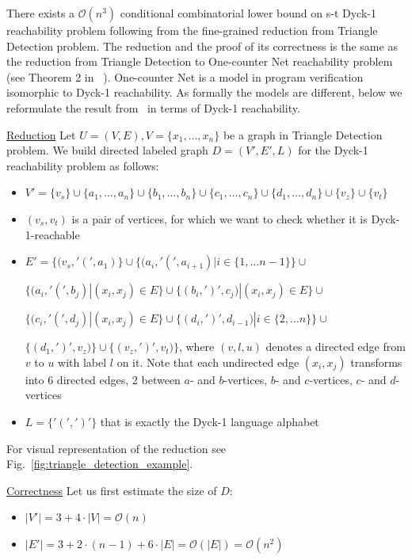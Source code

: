 \documentclass[12pt]{article}
\begin{document}
There exists a $\mathcal{O}(n^3)$ conditional combinatorial lower bound on s-t Dyck-1 reachability problem following from the fine-grained reduction from Triangle Detection problem. The reduction and the proof of its correctness is the same as the reduction from Triangle Detection to One-counter Net reachability problem (see Theorem 2 in ~\cite{hansen2021tight}). One-counter Net is a model in program verification isomorphic to Dyck-1 reachability. As formally the models are different, below we reformulate the result from~\cite{hansen2021tight} in terms of Dyck-1 reachability.

\underline{Reduction} Let $U = (V, E), V = \{x_1, \ldots, x_n\}$ be a graph in Triangle Detection problem. We build directed labeled graph $D = (V', E', L)$ for the Dyck-1 reachability problem as follows:

\begin{itemize}
    \item $V' = \{v_s\} \cup \{a_1, \ldots, a_n\} \cup \{b_1, \ldots, b_n\} \cup \{c_1, \ldots, c_n\} \cup \{d_1, \ldots, d_n\} \cup \{v_z\} \cup \{v_t\}$
    \item $(v_s, v_t)$ is a pair of vertices, for which we want to check whether it is Dyck-1-reachable
    \item $E' = \{(v_s, '(', a_1)\} \cup 
    \{(a_i, '(', a_{i+1})|i \in \{1, \ldots n - 1\}\} \cup$ 
    
    $\{(a_i, '(', b_j)|(x_i, x_j) \in E\} \cup
    \{(b_i, ')', c_j)|(x_i, x_j) \in E\} \cup$
    
    $\{(c_i, '(', d_j)|(x_i, x_j) \in E\} \cup
    \{(d_i, ')', d_{i-1})|i \in \{2, \ldots n\}\} \cup$
    
    $\{(d_1, ')', v_z)\} \cup \{(v_z, ')', v_t)\}$, where $(v, l, u)$ denotes a directed edge from $v$ to $u$ with label $l$ on it. Note that each undirected edge $(x_i, x_j)$ transforms into 6 directed edges, 2 between $a$- and $b$-vertices, $b$- and $c$-vertices, $c$- and $d$-vertices
    
    \item $L = \{'(', ')'\}$ that is exactly the Dyck-1 language alphabet 
\end{itemize}

For visual representation of the reduction see Fig.~\ref{fig:triangle_detection_example}.

\underline{Correctness} Let us first estimate the size of $D$:

\begin{itemize}
    \item $|V'| = 3 + 4 \cdot |V| = \mathcal{O}(n)$
    \item $|E'| = 3 + 2 \cdot (n - 1) + 6 \cdot |E| = \mathcal{O}(|E|) = \mathcal{O}(n^2)$
\end{itemize}
\end{document}
